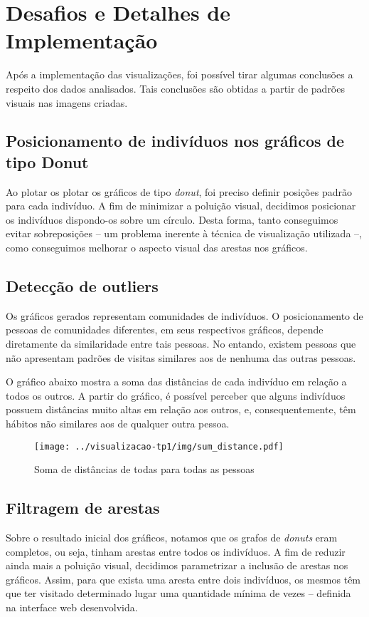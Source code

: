 \documentclass[12pt]{article}
\begin{document}
\section{Desafios e Detalhes de Implementação}
Após a implementação das visualizações, foi possível tirar algumas conclusões
a respeito dos dados analisados. Tais conclusões são obtidas a partir
de padrões visuais nas imagens criadas.

\subsection{Posicionamento de indivíduos nos gráficos de tipo Donut}
Ao plotar os plotar os gráficos de tipo {\it donut}, foi preciso definir
posições padrão para cada indivíduo. A fim de minimizar a poluição visual,
decidimos posicionar os indivíduos dispondo-os sobre um círculo.
Desta forma, tanto conseguimos evitar sobreposições -- um problema inerente
à técnica de visualização utilizada --, como conseguimos melhorar o aspecto
visual das arestas nos gráficos.

\subsection{Detecção de outliers}
Os gráficos gerados representam comunidades de indivíduos. O posicionamento
de pessoas de comunidades diferentes, em seus respectivos gráficos, depende
diretamente da similaridade entre tais pessoas. No entando, existem pessoas
que não apresentam padrões de visitas similares aos de nenhuma das outras
pessoas.

O gráfico abaixo mostra a soma das distâncias de cada indivíduo em relação
a todos os outros. A partir do gráfico, é possível perceber que alguns
indivíduos possuem distâncias muito altas em relação aos outros, e,
consequentemente, têm hábitos não similares aos de qualquer outra pessoa.
\begin{figure}[!h]
\centering
\texttt{[image: ../visualizacao-tp1/img/sum\_distance.pdf]}
\caption{Soma de distâncias de todas para todas as pessoas}
\end{figure}

\subsection{Filtragem de arestas}
Sobre o resultado inicial dos gráficos, notamos que os grafos de {\it donuts}
eram completos, ou seja, tinham arestas entre todos os indivíduos.
A fim de reduzir ainda mais a poluição visual, decidimos parametrizar
a inclusão de arestas nos gráficos. Assim, para que exista uma aresta
entre dois indivíduos, os mesmos têm que ter visitado determinado lugar
uma quantidade mínima de vezes -- definida na interface web desenvolvida.
\end{document}
